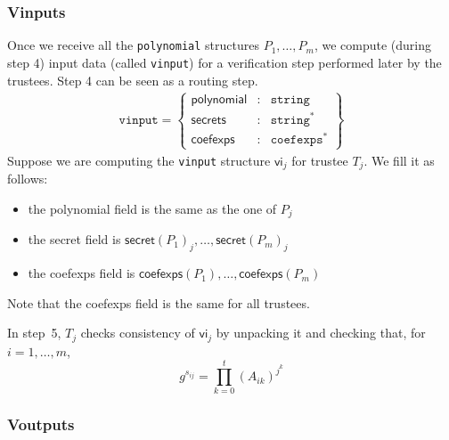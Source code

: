 \documentclass[a4paper]{article}
\newcommand{\jstring}{\texttt{string}}
\begin{document}
\subsubsection{Vinputs}
\label{vinputs}

Once we receive all the \texttt{polynomial} structures
$P_1,\dotsc,P_m$, we compute (during step 4) input data (called
\texttt{vinput}) for a verification step performed later by the
trustees. Step 4 can be seen as a routing step.
\begin{gather*}
  \texttt{vinput}=\left\{
    \begin{array}{rcl}
      \textsf{polynomial}&:&\jstring\\
      \textsf{secrets}&:&\jstring^\ast\\
      \textsf{coefexps}&:&\texttt{coefexps}^\ast
    \end{array}
  \right\}
\end{gather*}
Suppose we are computing the \texttt{vinput} structure $\textsf{vi}_j$
for trustee $T_j$. We fill it as follows:
\begin{itemize}
\item the \textsf{polynomial} field is the same as the one of $P_j$
\item the \textsf{secret} field is
  $\textsf{secret}(P_1)_j,\dotsc,\textsf{secret}(P_m)_j$
\item the \textsf{coefexps} field is
  $\textsf{coefexps}(P_1),\dotsc,\textsf{coefexps}(P_m)$
\end{itemize}
Note that the \textsf{coefexps} field is the same for all trustees.

In step~5, $T_j$ checks consistency of $\textsf{vi}_j$ by unpacking it
and checking that, for $i=1,\dotsc,m$,
\[
g^{s_{ij}}=\prod_{k=0}^t(A_{ik})^{j^k}
\]

\subsubsection{Voutputs}
\label{voutputs}
\end{document}
